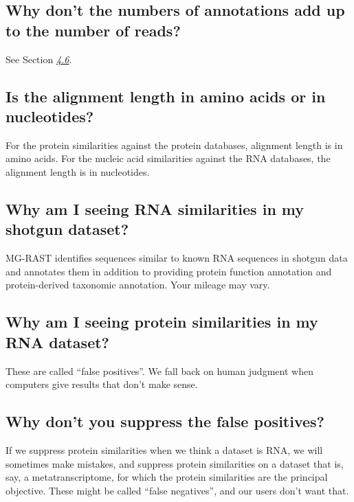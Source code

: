 \documentclass[letterpaper,10pt,english]{sphinxmanual}
\begin{document}
\subsection{Why don’t the numbers of annotations add up to the number of reads?}
\label{\detokenize{user_manual:why-dont-the-numbers-of-annotations-add-up-to-the-number-of-reads}}
See Section {\hyperref[\detokenize{user_manual:section:annotation_numbers}]{\emph{4.6}}}.


\subsection{Is the alignment length in amino acids or in nucleotides?}
\label{\detokenize{user_manual:is-the-alignment-length-in-amino-acids-or-in-nucleotides}}
For the protein similarities against the protein databases, alignment
length is in amino acids. For the nucleic acid similarities against the
RNA databases, the alignment length is in nucleotides.


\subsection{Why am I seeing RNA similarities in my shotgun dataset?}
\label{\detokenize{user_manual:why-am-i-seeing-rna-similarities-in-my-shotgun-dataset}}
MG-RAST identifies sequences similar to known RNA sequences in shotgun
data and annotates them in addition to providing protein function
annotation and protein-derived taxonomic annotation. Your mileage may
vary.


\subsection{Why am I seeing protein similarities in my RNA dataset?}
\label{\detokenize{user_manual:why-am-i-seeing-protein-similarities-in-my-rna-dataset}}
These are called “false positives”. We fall back on human judgment when
computers give results that don’t make sense.


\subsection{Why don’t you suppress the false positives?}
\label{\detokenize{user_manual:why-dont-you-suppress-the-false-positives}}
If we suppress protein similarities when we think a dataset is RNA, we
will sometimes make mistakes, and suppress protein similarities on a
dataset that is, say, a metatranscriptome, for which the protein
similarities are the principal objective. These might be called “false
negatives”, and our users don’t want that.
\end{document}

